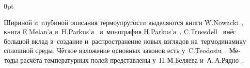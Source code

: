 \begin{changemargin}{\parindent}{0pt}
\fontsize{10}{12}\selectfont

\begin{otherlanguage}{russian}

Шириной и~глубиной
описания термоупругости
выделяются книги
\hbox{W\hspace{-0.2ex}.\:Nowacki}~\cite{nowacki-problemsofthermoelasticity, nowacki-elasticity},
книга E.\:Melan’а и~H.\:Parkus’а~\cite{parkus.melan-waermespannungen}
и~моно\-графия H.\:Parkus’а~\cite{parkus-waermespannungen}.
C.\:Truesdell~\cite{truesdell-firstcourse}
внёс большой вклад
в~создание
и~распространение
новых взглядов
на~термодинамику
сплошной среды.
Чёткое
изложение основных законов
есть у~C.\:Teodosiu~\cite{teodosiu-crystaldefects}.
Методы расчёта
температурных полей
представлены
у~Н.\,М.\;Беляева и~А.\,А.\;Рядно~\cite{belyaev.ryadno}.

\end{otherlanguage}

\end{changemargin}

